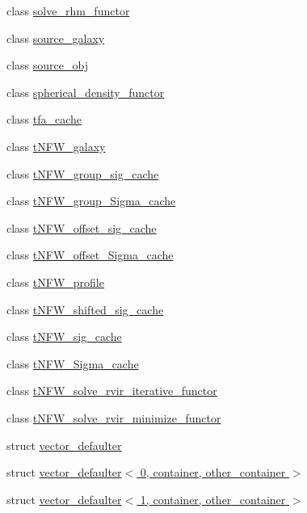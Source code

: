 \begin{DoxyCompactItemize}
class \hyperlink{classIceBRG_1_1solve__rhm__functor}{solve\+\_\+rhm\+\_\+functor}
\item 
class \hyperlink{classIceBRG_1_1source__galaxy}{source\+\_\+galaxy}
\item 
class \hyperlink{classIceBRG_1_1source__obj}{source\+\_\+obj}
\item 
class \hyperlink{classIceBRG_1_1spherical__density__functor}{spherical\+\_\+density\+\_\+functor}
\item 
class \hyperlink{classIceBRG_1_1tfa__cache}{tfa\+\_\+cache}
\item 
class \hyperlink{classIceBRG_1_1tNFW__galaxy}{t\+N\+F\+W\+\_\+galaxy}
\item 
class \hyperlink{classIceBRG_1_1tNFW__group__sig__cache}{t\+N\+F\+W\+\_\+group\+\_\+sig\+\_\+cache}
\item 
class \hyperlink{classIceBRG_1_1tNFW__group__Sigma__cache}{t\+N\+F\+W\+\_\+group\+\_\+\+Sigma\+\_\+cache}
\item 
class \hyperlink{classIceBRG_1_1tNFW__offset__sig__cache}{t\+N\+F\+W\+\_\+offset\+\_\+sig\+\_\+cache}
\item 
class \hyperlink{classIceBRG_1_1tNFW__offset__Sigma__cache}{t\+N\+F\+W\+\_\+offset\+\_\+\+Sigma\+\_\+cache}
\item 
class \hyperlink{classIceBRG_1_1tNFW__profile}{t\+N\+F\+W\+\_\+profile}
\item 
class \hyperlink{classIceBRG_1_1tNFW__shifted__sig__cache}{t\+N\+F\+W\+\_\+shifted\+\_\+sig\+\_\+cache}
\item 
class \hyperlink{classIceBRG_1_1tNFW__sig__cache}{t\+N\+F\+W\+\_\+sig\+\_\+cache}
\item 
class \hyperlink{classIceBRG_1_1tNFW__Sigma__cache}{t\+N\+F\+W\+\_\+\+Sigma\+\_\+cache}
\item 
class \hyperlink{classIceBRG_1_1tNFW__solve__rvir__iterative__functor}{t\+N\+F\+W\+\_\+solve\+\_\+rvir\+\_\+iterative\+\_\+functor}
\item 
class \hyperlink{classIceBRG_1_1tNFW__solve__rvir__minimize__functor}{t\+N\+F\+W\+\_\+solve\+\_\+rvir\+\_\+minimize\+\_\+functor}
\item 
struct \hyperlink{structIceBRG_1_1vector__defaulter}{vector\+\_\+defaulter}
\item 
struct \hyperlink{structIceBRG_1_1vector__defaulter_3_010_00_01container_00_01other__container_01_4}{vector\+\_\+defaulter$<$ 0, container, other\+\_\+container $>$}
\item 
struct \hyperlink{structIceBRG_1_1vector__defaulter_3_011_00_01container_00_01other__container_01_4}{vector\+\_\+defaulter$<$ 1, container, other\+\_\+container $>$}

\end{DoxyCompactItemize}
